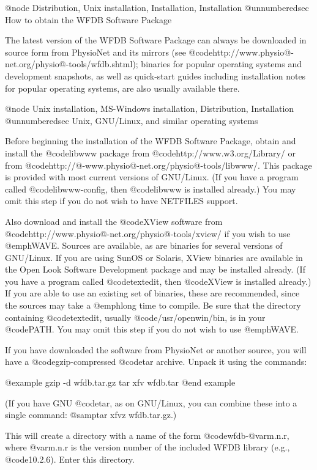 {{{{{{{{{@node Distribution, Unix installation, Installation, Installation
@unnumberedsec How to obtain the WFDB Software Package

The latest version of the WFDB Software Package can always be downloaded in
source form from PhysioNet and its mirrors (see
@code{http://www.physio@-net.org/physio@-tools/wfdb.shtml}); binaries for
popular operating systems and development snapshots, as well as quick-start
guides including installation notes for popular operating systems, are also
usually available there.

@node Unix installation, MS-Windows installation, Distribution, Installation
@unnumberedsec Unix, GNU/Linux, and similar operating systems

Before beginning the installation of the WFDB Software Package, obtain and
install the @code{libwww} package from @code{http://www.w3.org/Library/} or
from @code{http://@-www.physio@-net.org/physio@-tools/libwww/}.  This package
is provided with most current versions of GNU/Linux.  (If you have a program
called @code{libwww-config}, then @code{libwww} is installed already.)  You may
omit this step if you do not wish to have NETFILES support.

Also download and install the @code{XView} software from
@code{http://www.physio@-net.org/physio@-tools/xview/} if you wish to use
@emph{WAVE}.  Sources are available, as are binaries for several versions of
GNU/Linux.  If you are using SunOS or Solaris, XView binaries are available in
the Open Look Software Development package and may be installed already.  (If
you have a program called @code{textedit}, then @code{XView} is installed
already.) If you are able to use an existing set of binaries, these are
recommended, since the sources may take a @emph{long} time to compile.  Be sure
that the directory containing @code{textedit}, usually @code{/usr/openwin/bin},
is in your @code{PATH}.  You may omit this step if you do not wish to use
@emph{WAVE}.

If you have downloaded the software from PhysioNet or another source, you
will have a @code{gzip}-compressed @code{tar} archive.  Unpack it using
the commands:

@example
gzip -d wfdb.tar.gz
tar xfv wfdb.tar
@end example

(If you have GNU @code{tar}, as on GNU/Linux, you can combine these into a
single command: @samp{tar xfvz wfdb.tar.gz}.)

This will create a directory with a name of the form @code{wfdb-}@var{m.n.r},
where @var{m.n.r} is the version number of the included WFDB library (e.g.,
@code{10.2.6}).  Enter this directory.

}}}}}}}}}
